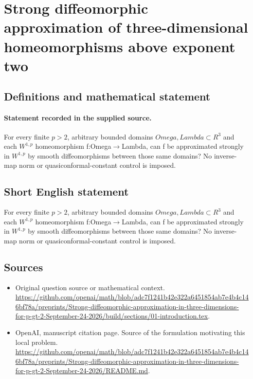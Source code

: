 \documentclass[11pt]{article}
\begin{document}
\section*{Strong diffeomorphic approximation of three-dimensional homeomorphisms above exponent two}\label{30007341}
\subsection{Definitions and mathematical statement}
\paragraph{Statement recorded in the supplied source.}
For every finite $p>2$, arbitrary bounded domains $Omega,Lambda\subset R^3$ and each $W^{1,p}$ homeomorphism f:Omega$\to$Lambda, can f be approximated strongly in $W^{1,p}$ by smooth diffeomorphisms between those same domains? No inverse-map norm or quasiconformal-constant control is imposed.
\subsection{Short English statement}
For every finite $p>2$, arbitrary bounded domains $Omega,Lambda\subset R^3$ and each $W^{1,p}$ homeomorphism f:Omega$\to$Lambda, can f be approximated strongly in $W^{1,p}$ by smooth diffeomorphisms between those same domains? No inverse-map norm or quasiconformal-constant control is imposed.
\subsection{Sources}
\begin{itemize}
\item[S1] Original question source or mathematical context.
\url{https://github.com/openai/math/blob/adc7f1241b42e322a6451854ab7e4b4c146bf78a/preprints/Strong-diffeomorphic-approximation-in-three-dimensions-for-p-gt-2-September-24-2026/build/sections/01-introduction.tex}.
\item[S2] OpenAI, manuscript citation page. Source of the formulation motivating this local problem.
\url{https://github.com/openai/math/blob/adc7f1241b42e322a6451854ab7e4b4c146bf78a/preprints/Strong-diffeomorphic-approximation-in-three-dimensions-for-p-gt-2-September-24-2026/README.md}.
\end{itemize}
\end{document}
